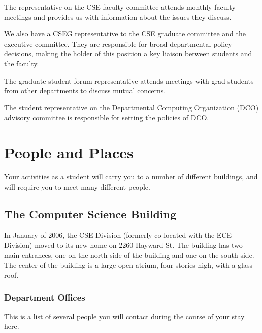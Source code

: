 \documentclass[11pt]{article}
\begin{document}
The representative on the CSE faculty committee attends monthly
faculty meetings and provides us with information about the issues
they discuss.

We also have a CSEG representative to the CSE graduate committee and
the executive committee.  They are responsible for broad departmental
policy decisions, making the holder of this position a key liaison
between students and the faculty.

The graduate student forum representative attends meetings with grad
students from other departments to discuss mutual concerns.

The student representative on the Departmental Computing Organization
(DCO) advisory committee is responsible for setting the policies of
DCO.

\newpage
\section{People and Places}
\label{sec-3}

Your activities as a student will carry you to a number of different buildings, and will require you to meet many different people.
\subsection{The Computer Science Building}
\label{sec-3_1}

In January of 2006, the CSE Division (formerly co-located with the ECE Division) moved to its new home on 2260 Hayward St.  The building has two main entrances, one on the north side of the building and one on the south side.  The center of the building is a large open atrium, four stories high, with a glass roof.
\subsubsection{Department Offices}
\label{sec-3_1_1}

This is a list of several people you will contact during the course of
your stay here.
\end{document}

